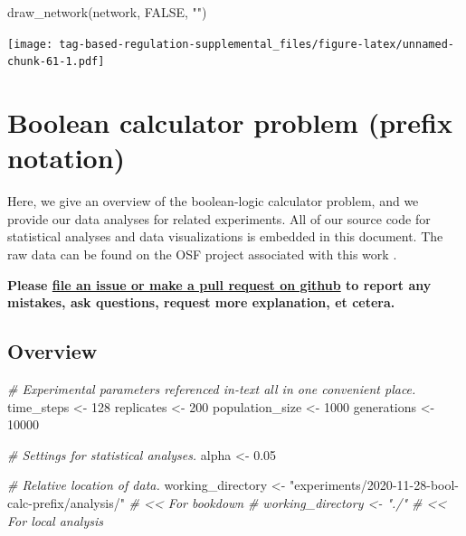 \documentclass[
]{book}
\newenvironment{Shaded}{\begin{snugshade}}{\end{snugshade}}
\newcommand{\CommentTok}[1]{\textcolor[rgb]{0.56,0.35,0.01}{\textit{#1}}}
\newcommand{\ConstantTok}[1]{\textcolor[rgb]{0.00,0.00,0.00}{#1}}
\newcommand{\DecValTok}[1]{\textcolor[rgb]{0.00,0.00,0.81}{#1}}
\newcommand{\FloatTok}[1]{\textcolor[rgb]{0.00,0.00,0.81}{#1}}
\newcommand{\FunctionTok}[1]{\textcolor[rgb]{0.00,0.00,0.00}{#1}}
\newcommand{\NormalTok}[1]{#1}
\newcommand{\OtherTok}[1]{\textcolor[rgb]{0.56,0.35,0.01}{#1}}
\newcommand{\StringTok}[1]{\textcolor[rgb]{0.31,0.60,0.02}{#1}}
\begin{document}
\begin{Shaded}
\begin{Highlighting}[]
\FunctionTok{draw\_network}\NormalTok{(network, }\ConstantTok{FALSE}\NormalTok{, }\StringTok{""}\NormalTok{)}
\end{Highlighting}
\end{Shaded}

\texttt{[image: tag-based-regulation-supplemental\_files/figure-latex/unnamed-chunk-61-1.pdf]}

\hypertarget{boolean-calculator-problem-prefix-notation}{%
\chapter{Boolean calculator problem (prefix notation)}\label{boolean-calculator-problem-prefix-notation}}

Here, we give an overview of the boolean-logic calculator problem, and we provide our data analyses for related experiments.
All of our source code for statistical analyses and data visualizations is embedded in this document.
The raw data can be found on the OSF project associated with this work \citep{Lalejini_Moreno_Ofria_Data_2020}.

\textbf{Please \href{https://github.com/amlalejini/Tag-based-Genetic-Regulation-for-LinearGP/issues}{file an issue or make a pull request on github} to report any mistakes, ask questions, request more explanation, et cetera.}

\hypertarget{overview-2}{%
\section{Overview}\label{overview-2}}

\begin{Shaded}
\begin{Highlighting}[]
\CommentTok{\# Experimental parameters referenced in{-}text all in one convenient place.}
\NormalTok{time\_steps }\OtherTok{\textless{}{-}} \DecValTok{128}
\NormalTok{replicates }\OtherTok{\textless{}{-}} \DecValTok{200}
\NormalTok{population\_size }\OtherTok{\textless{}{-}} \DecValTok{1000}
\NormalTok{generations }\OtherTok{\textless{}{-}} \DecValTok{10000}

\CommentTok{\# Settings for statistical analyses.}
\NormalTok{alpha }\OtherTok{\textless{}{-}} \FloatTok{0.05}

\CommentTok{\# Relative location of data.}
\NormalTok{working\_directory }\OtherTok{\textless{}{-}} \StringTok{"experiments/2020{-}11{-}28{-}bool{-}calc{-}prefix/analysis/"} \CommentTok{\# \textless{}\textless{} For bookdown}
\CommentTok{\# working\_directory \textless{}{-} "./"                                              \# \textless{}\textless{} For local analysis}
\end{Highlighting}
\end{Shaded}
\end{document}
